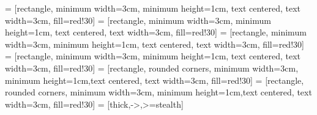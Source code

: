 \documentclass{article}
\begin{document}

 = [rectangle, minimum width=3cm, minimum height=1cm, text centered, text width=3cm, fill=red!30]
 = [rectangle, minimum width=3cm, minimum height=1cm, text centered, text width=3cm, fill=red!30]
 = [rectangle, minimum width=3cm, minimum height=1cm, text centered, text width=3cm, fill=red!30]
 = [rectangle, minimum width=3cm, minimum height=1cm, text centered, text width=3cm, fill=red!30]
 = [rectangle, rounded corners, minimum width=3cm, minimum height=1cm,text centered, text width=3cm, fill=red!30]
 = [rectangle, rounded corners, minimum width=3cm, minimum height=1cm,text centered, text width=3cm, fill=red!30]
 = [thick,->,>=stealth]


\def\blockdist{2.3}
\def\edgedist{2.5}

\end{document}
